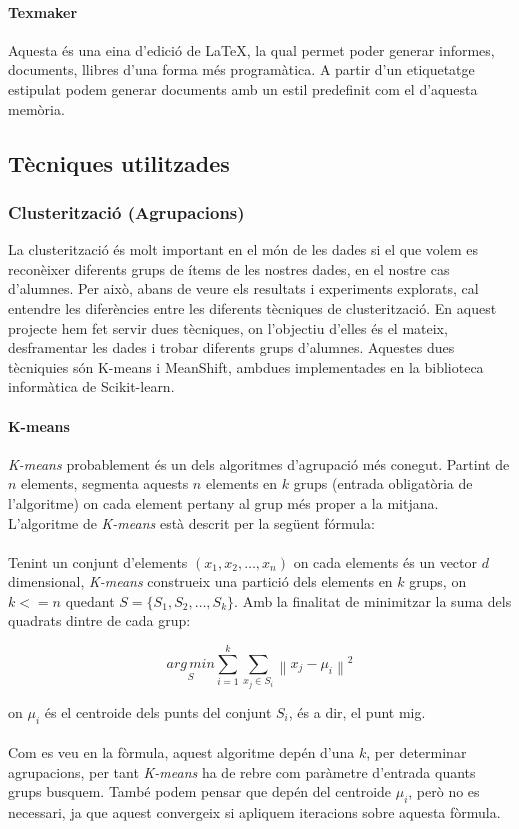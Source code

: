 \documentclass[11pt,a4paper,catalan]{article}
\begin{document}
\paragraph{Texmaker}
Aquesta és una eina d'edició de \LaTeX, la qual permet poder generar informes, documents, llibres d'una forma més programàtica. A partir d'un etiquetatge estipulat podem generar documents amb un estil predefinit com el d'aquesta memòria.

\newpage
\hypertarget{tecniquesutilitzades}{
	\subsection{Tècniques utilitzades}
}
\subsubsection{Clusterització (Agrupacions)}
La clusterització és molt important en el món de les dades si el que volem es reconèixer diferents grups de ítems de les nostres dades, en el nostre cas d'alumnes. Per això, abans de veure els resultats i experiments explorats, cal entendre les diferències entre les diferents tècniques de clusterització. En aquest projecte hem fet servir dues tècniques, on l'objectiu d'elles és el mateix, desframentar les dades i trobar diferents grups d'alumnes. Aquestes dues tècniquies són K-means i MeanShift, ambdues implementades en la biblioteca informàtica de Scikit-learn. 

\paragraph{K-means}
\textit{K-means} probablement és un dels algoritmes d'agrupació més conegut. Partint de $n$ elements, segmenta aquests $n$ elements en $k$ grups (entrada obligatòria de l'algoritme) on cada element pertany al grup més proper a la mitjana. L'algoritme de \textit{K-means} està descrit per la següent fórmula:
\\
\\
Tenint un conjunt d'elements $(x_1, x_2, \ldots, x_n)$ on cada elements és un vector $d$ dimensional, \textit{K-means} construeix una partició dels elements en $k$ grups, on $k <= n$ quedant $S = \{S_1, S_2, \ldots, S_k\}$. Amb la finalitat de minimitzar la suma dels quadrats dintre de cada grup:

$$ \underset{S} {arg\,min} \sum_{i=1}^{k} \sum_{x_j \in S_i} \left\| x_j - \mu_i \right\|^2 $$

on $\mu_i$ és el centroide dels punts del conjunt $S_i$, és a dir, el punt mig.
\\
\\
Com es veu en la fòrmula, aquest algoritme depén d'una $k$, per determinar agrupacions, per tant \textit{K-means} ha de rebre com paràmetre d'entrada quants grups busquem. També podem pensar que depén del centroide $\mu_i$, però no es necessari, ja que aquest convergeix si apliquem iteracions sobre aquesta fòrmula.
\end{document}
